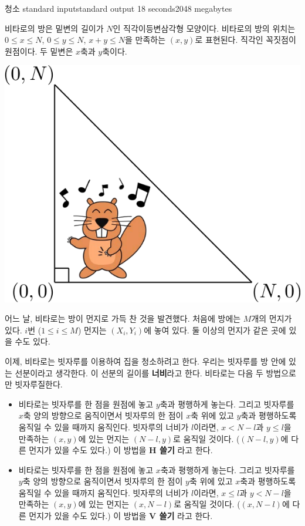 \begin{problem}{청소}
	{standard input}{standard output}
	{18 seconds}{2048 megabytes}{}
	
	비타로의 방은 밑변의 길이가 $N$인 직각이등변삼각형 모양이다. 비타로의 방의 위치는 $0 \le x \le N$, $0 \le y \le N$, $x+y \le N$을 만족하는 $(x, y)$로 표현된다. 직각인 꼭짓점이 원점이다. 두 밑변은 $x$축과 $y$축이다.
	
	\begin{center}
		\includegraphics[width=0.5\linewidth]{img1.png}
	\end{center}
	
	
	
	어느 날, 비타로는 방이 먼지로 가득 찬 것을 발견했다. 처음에 방에는 $M$개의 먼지가 있다. $i$번 ($1 \le i \le M$) 먼지는 $(X_i, Y_i)$에 놓여 있다. 둘 이상의 먼지가 같은 곳에 있을 수도 있다.
	
	이제, 비타로는 빗자루를 이용하여 집을 청소하려고 한다. 우리는 빗자루를 방 안에 있는 선분이라고 생각한다. 이 선분의 길이를 \textbf{너비}라고 한다. 비타로는 다음 두 방법으로만 빗자루질한다.
	
	
	\begin{itemize}
		\item 비타로는 빗자루를 한 점을 원점에 놓고 $y$축과 평행하게 놓는다. 그리고 빗자루를 $x$축 양의 방향으로 움직이면서 빗자루의 한 점이 $x$축 위에 있고 $y$축과 평행하도록 움직일 수 있을 때까지 움직인다. 빗자루의 너비가 $l$이라면, $x<N-l$과 $y \le l$을 만족하는 $(x, y)$에 있는 먼지는 $(N-l, y)$로 움직일 것이다. ($(N-l, y)$에 다른 먼지가 있을 수도 있다.) 이 방법을 \textbf{H 쓸기} 라고 한다.
		
		\item 비타로는 빗자루를 한 점을 원점에 놓고 $x$축과 평행하게 놓는다. 그리고 빗자루를 $y$축 양의 방향으로 움직이면서 빗자루의 한 점이 $y$축 위에 있고 $x$축과 평행하도록 움직일 수 있을 때까지 움직인다. 빗자루의 너비가 $l$이라면, $x\le l$과 $y < N-l$을 만족하는 $(x, y)$에 있는 먼지는 $(x, N-l)$로 움직일 것이다. ($(x, N-l)$에 다른 먼지가 있을 수도 있다.) 이 방법을 \textbf{V 쓸기} 라고 한다.
	\end{itemize}
	

\end{problem}
